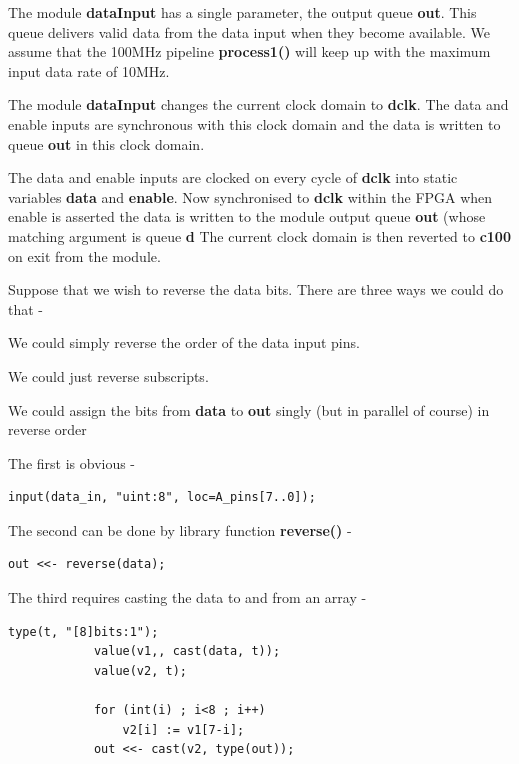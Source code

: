         The module {\bf dataInput} has a single parameter, the output queue {\bf
        out}. This queue delivers valid data from the data input when they
        become available. We assume that the 100MHz pipeline {\bf process1()}
        will keep up with the maximum input data rate of 10MHz.
        
        The module {\bf dataInput} changes the current clock domain to
        {\bf dclk}. The data and enable inputs are synchronous with
        this clock domain and the data is written to queue {\bf out} in this
        clock domain.
        
        The data and enable inputs are clocked on every cycle of {\bf dclk} into
        static variables {\bf data} and {\bf enable}. Now synchronised to {\bf
        dclk} within the FPGA when enable is asserted the data is written to the
        module output queue {\bf out} (whose matching argument is queue {\bf d}
        The current clock domain is then reverted to {\bf c100} on exit from the
        module.
        
        Suppose that we wish to reverse the data bits. There are three ways
        we could do that -
        \blist
        \item   We could simply reverse the order of the data input pins.
        \item   We could just reverse subscripts.
        \item   We could assign the bits from {\bf data} to {\bf out} singly
                (but in parallel of course) in reverse order
        \blend
        
        The first is obvious -
        \begin{lstlisting}[gobble=8, language=threepl]
            input(data_in, "uint:8", loc=A_pins[7..0]);
        \end{lstlisting}
        
        The second can be done by library function {\bf reverse()} -
        \begin{lstlisting}[gobble=8, language=threepl]
            out <<- reverse(data);
        \end{lstlisting}
        
        The third requires casting the data to and from an array -
        \begin{lstlisting}[gobble=8, language=threepl]
            type(t, "[8]bits:1");
            value(v1,, cast(data, t));
            value(v2, t);
            
            for (int(i) ; i<8 ; i++)
                v2[i] := v1[7-i];                    
            out <<- cast(v2, type(out));
        \end{lstlisting}
        
